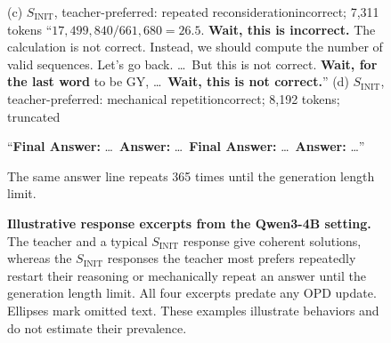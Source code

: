 \begin{figure}[t]
        {(c) $S_{\mathrm{INIT}}$, teacher-preferred: repeated reconsideration}{incorrect; 7,311 tokens}{%
        ``$17{,}499{,}840/661{,}680=26.5$.
        \textbf{Wait, this is incorrect.} The calculation is not correct.
        Instead, we should compute the number of valid sequences. Let's go
        back. \ldots\ But this is not correct. \textbf{Wait, for the last word}
        to be GY, \ldots\ \textbf{Wait, this is not correct.}''}
    \hfill
        {(d) $S_{\mathrm{INIT}}$, teacher-preferred: mechanical repetition}{correct; 8,192 tokens; truncated}{%
        ``\textbf{Final Answer: } \ldots\
        \textbf{Answer: } \ldots\
        \textbf{Final Answer: } \ldots\
        \textbf{Answer: } \ldots''\par
        \vspace{2pt}
        The same answer line repeats 365 times until the generation length
        limit.}
    \endgroup
    \caption{
        \textbf{Illustrative response excerpts from the Qwen3-4B setting.}
        The teacher and a typical $S_{\mathrm{INIT}}$ response give coherent
        solutions, whereas the $S_{\mathrm{INIT}}$ responses the teacher most
        prefers repeatedly restart their reasoning or mechanically repeat an
        answer until the generation length limit. All four excerpts predate any
        OPD update. Ellipses mark omitted text. These examples illustrate
        behaviors and do not estimate their prevalence.
    }
    \label{fig:qualitative_response_examples}
\end{figure}

